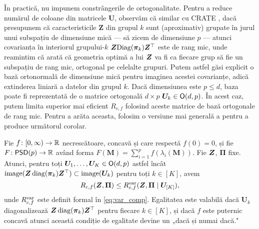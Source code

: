 \documentclass[../../book-main_ro.tex]{subfiles}
\begin{document}
În practică, nu impunem constrângerile de ortogonalitate. Pentru a reduce numărul de coloane din matricele $\bm U$, observăm că similar cu CRATE \citep{yu2023white}, dacă presupunem că caracteristicile $\bm Z$ din grupul \(k\) sunt (aproximativ) grupate în jurul unui subspațiu de dimensiune mică --- să zicem de dimensiune \(p\) --- atunci covarianța în interiorul grupului-\(k\) \(\bm{Z}\mathrm{Diag}(\bm \pi_{k})\bm{Z}^{\top}\) este de rang mic, unde reamintim că \cite{yu2020learning} arată că geometria optimă a lui $\bm{Z}$ va fi ca fiecare grup să fie un subspațiu de rang mic, ortogonal pe celelalte grupuri. Putem astfel găsi explicit o bază ortonormală de dimensiune mică pentru imaginea acestei covarianțe, adică extinderea liniară a datelor din grupul \(k\). Dacă dimensiunea este $p \leq d$, baza poate fi reprezentată de o matrice ortogonală $d\times p$ $\bm U_k \in \mathsf{O}(d, p)$. În acest caz, putem limita superior mai eficient \(R_{c,f}\) folosind aceste matrice de bază ortogonale de rang mic. Pentru a arăta aceasta, folosim o versiune mai generală a  pentru a produce următorul corolar.
\begin{corollary}\label{cor:var_concave_logdet}
    Fie \(f \colon [0, \infty) \to \mathbb{R}\) necrescătoare, concavă și care respectă \(f(0) = 0\), și fie \(F \colon \mathsf{PSD}(p) \to \mathbb{R}\) având forma \(F(\bm M) = \sum_{i = 1}^{p}f(\lambda_{i}(\bm M))\). Fie \(\bm{Z}\), \(\bm \Pi\) fixe. Atunci, pentru toți \(\bm U_{1}, \dots, \bm U_{K} \in \mathsf{O}(d, p)\) astfel încât \(\mathrm{image}(\bm{Z}\operatorname{diag}(\bm \pi_{k})\bm{Z}^{\top}) \subset \mathrm{image}(\bm U_{k})\) pentru toți \(k \in [K]\), avem
    \begin{equation}
        R_{c, f}(\bm{Z}, \bm\Pi) \leq R_{c, f}^{\rm var}(\bm{Z}, \bm\Pi \mid \bm U_{[K]}), 
    \end{equation}
     unde \(R_{c, f}^{\rm var}\) este definit formal în \eqref{eq:var_comp}. Egalitatea este valabilă dacă \(\bm U_{k}\) diagonalizează \(\bm{Z}\operatorname{diag}(\bm \pi_{k})\bm{Z}^{\top}\) pentru fiecare \(k \in [K]\), și dacă \(f\) este puternic concavă atunci această condiție de egalitate devine un „dacă și numai dacă."
\end{corollary}
\end{document}
